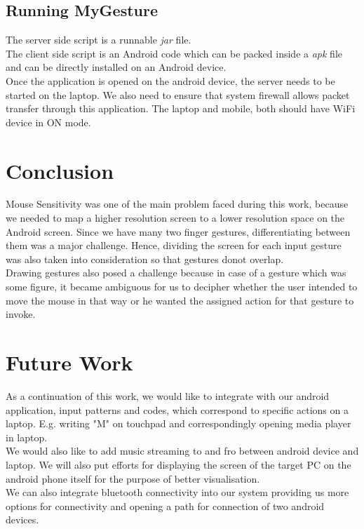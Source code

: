 \documentclass[10pt,conference,letterpaper]{IEEEtran}
\begin{document}
\subsection{Running MyGesture}
The server side script is a runnable \emph{jar} file.\\
The client side script is an Android code which can be packed inside a \emph{apk} file and can be directly installed on an Android device.\\
Once the application is opened on the android device, the server needs to be started on the laptop. We also need to ensure that system firewall allows packet transfer through this application. The laptop and mobile, both should have WiFi device in ON mode.\\

\section{Conclusion}
Mouse Sensitivity was one of the main problem faced during this work, because we needed to map a higher resolution screen to a lower resolution space on the Android screen. Since we have many two finger gestures, differentiating between them was a major challenge. Hence, dividing the screen for each input gesture was also taken into consideration so that gestures donot overlap.\\
Drawing gestures also posed a challenge because in case of a gesture which was some figure, it became ambiguous for us to decipher whether the user intended to move the mouse in that way or he wanted the assigned action for that gesture to invoke.\\

\section{Future Work}
As a continuation of this work, we would like to integrate with our android application, input patterns and codes, which correspond to specific actions on a laptop. E.g. writing "M" on touchpad and correspondingly opening media player in laptop.\\ We would also like to add music streaming to and fro between android device and laptop. We will also put efforts for displaying the screen of the target PC on the android phone itself for the purpose of better visualisation.\\
We can also integrate bluetooth connectivity into our system providing us more options for connectivity and opening a path for connection of two android devices.\\
\end{document}
